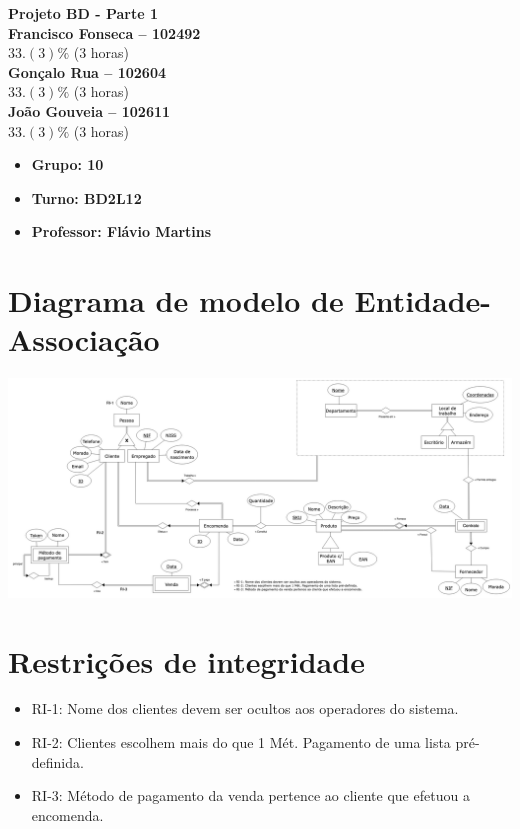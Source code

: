 \documentclass{article}
\begin{document}
\begin{titlepage}
    \vspace*{\fill}
    \begin{center}
        {\Huge\bfseries Projeto BD - Parte 1\\}
        \vspace{1cm}
        {\Large\bfseries Francisco Fonseca -- 102492}\\[5pt]
        $33.(3)\%$ (3 horas)\\[14pt]
        {\Large\bfseries Gonçalo Rua -- 102604}\\[5pt]
        $33.(3)\%$ (3 horas)\\[14pt]
        {\Large\bfseries João Gouveia -- 102611}\\[5pt]
        $33.(3)\%$ (3 horas)\\[14pt]
    \end{center}
    \vspace*{\fill}

    \vspace{0.5cm}

    \begin{itemize}
        \item[] \Large\bfseries Grupo: 10
        \item[] \Large\bfseries Turno: BD2L12
        \item[] \Large\bfseries Professor: Flávio Martins
    \end{itemize}

\end{titlepage}

\section{Diagrama de modelo de Entidade-Associação}

\vspace{0.5cm}
\includegraphics[scale=0.2]{diagrama.png}
\vspace{0.5cm}

\section{Restrições de integridade}

\begin{itemize}
    \item RI-1: Nome dos clientes devem ser ocultos aos operadores do sistema.
    \item RI-2: Clientes escolhem mais do que 1 Mét. Pagamento de uma lista pré-definida.
    \item RI-3: Método de pagamento da venda pertence ao cliente que efetuou a encomenda.
\end{itemize}
\end{document}

